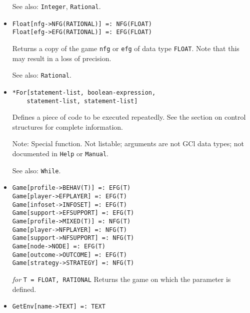 \begin{itemize}
{\it for} {\tt T = FLOAT, INTEGER, RATIONAL}
\bd
Returns the value of \verb+x+ as type \verb+FLOAT+.
In the case where \verb+x+ is \verb+RATIONAL+ this may result in a loss
of precision.
\item [See also:] \verb+Integer+, \verb+Rational+.
\ed

\item{}
\protect \large \begin{verbatim}
Float[nfg->NFG(RATIONAL)] =: NFG(FLOAT)
Float[efg->EFG(RATIONAL)] =: EFG(FLOAT)
\end{verbatim} \normalsize

\bd
Returns a copy of the game \verb+nfg+ or \verb+efg+ of data type 
\verb+FLOAT+. Note that this may result in a loss of precision.  
\item [See also:] \verb+Rational+.
\ed

\item{}
\protect \large \begin{verbatim}
*For[statement-list, boolean-expression, 
    statement-list, statement-list]
\end{verbatim}\normalsize

\bd
Defines a piece of code to be executed repeatedly.  See the section
on control structures for complete information.
\item [Note:] Special function.  Not listable; arguments are not GCl
data types; not documented in \verb+Help+ or \verb+Manual+.  
\item
[See also:] \verb+While+.
\ed


\item{}
\protect \large \begin{verbatim}
Game[profile->BEHAV(T)] =: EFG(T)
Game[player->EFPLAYER] =: EFG(T)
Game[infoset->INFOSET] =: EFG(T)
Game[support->EFSUPPORT] =: EFG(T)
Game[profile->MIXED(T)] =: NFG(T)
Game[player->NFPLAYER] =: NFG(T)
Game[support->NFSUPPORT] =: NFG(T)
Game[node->NODE] =: EFG(T)
Game[outcome->OUTCOME] =: EFG(T)
Game[strategy->STRATEGY] =: NFG(T)
\end{verbatim} \normalsize

{\it for} {\tt T = FLOAT, RATIONAL}
\bd
Returns the game on which the parameter is defined.
\ed

\item{}
\protect \large \begin{verbatim}
GetEnv[name->TEXT] =: TEXT
\end{verbatim} \normalsize


\end{itemize}
